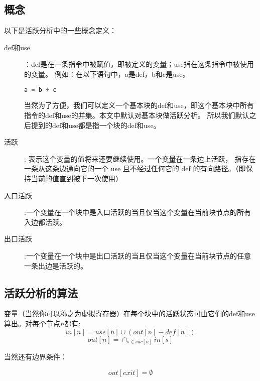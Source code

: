 \subsection{概念}

以下是活跃分析中的一些概念定义：

\begin{description}
    \item[def和use]：def是在一条指令中被赋值，即被定义的变量；use指在这条指令中被使用的变量。
例如：在以下语句中，a是def，b和c是use。
\begin{lstlisting}[language=c]
    a = b + c
\end{lstlisting}

当然为了方便，我们可以定义一个基本块的def和use，即这个基本块中所有指令的def和use的并集。本文中默认对基本块做活跃分析。
所以我们默认之后提到的def和use都是指一个块的def和use。

\item[活跃]: 表示这个变量的值将来还要继续使用。一个变量在一条边上活跃，
指存在一条从这条边通向它的一个 use 且不经过任何它的 def 的有向路径。（即保持当前的值直到被下一次使用）

\item[入口活跃]:一个变量在一个块中是入口活跃的当且仅当这个变量在当前块节点的所有入边都活跃。

\item[出口活跃]:一个变量在一个块中是出口活跃的当且仅当这个变量在当前块节点的任意一条出边是活跃的。

\end{description}

\subsection{活跃分析的算法}
变量（当然你可以称之为虚拟寄存器）在每个块中的活跃状态可由它们的def和use算出。对每个节点$n$都有:
$$
in[n] = use[n] \cup (out[n] - def[n])
$$
$$
out[n] = \cap_{s \in suc[n]} in[s]
$$

当然还有边界条件：

$$
out[exit] = \emptyset
$$

~\\


